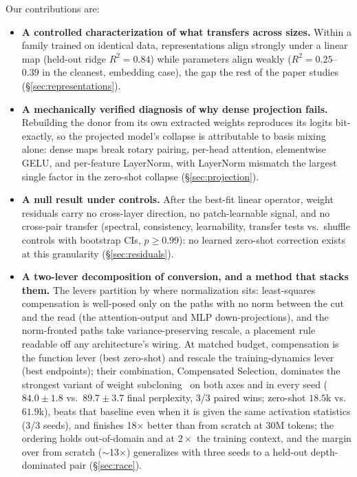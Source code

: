 Our contributions are:
\begin{itemize}
\item \textbf{A controlled characterization of what transfers across sizes.}
  Within a family trained on identical data, representations align strongly
  under a linear map (held-out ridge $R^2=0.84$) while parameters align weakly
  ($R^2=0.25$--$0.39$ in the cleanest, embedding case), the gap the rest of
  the paper studies (\S\ref{sec:representations}).
\item \textbf{A mechanically verified diagnosis of why dense projection fails.}
  Rebuilding the donor from its own extracted weights reproduces its logits
  bit-exactly, so the projected model's collapse is attributable to basis mixing
  alone: dense maps break rotary pairing, per-head attention, elementwise GELU,
  and per-feature LayerNorm, with LayerNorm mismatch the largest single
  factor in the zero-shot collapse
  (\S\ref{sec:projection}).
\item \textbf{A null result under controls.} After the best-fit linear operator,
  weight residuals carry no cross-layer direction, no patch-learnable signal, and
  no cross-pair transfer (spectral, consistency, learnability, transfer tests vs.\
  shuffle controls with bootstrap CIs, $p\ge0.99$): no learned zero-shot
  correction exists at this granularity (\S\ref{sec:residuals}).
\item \textbf{A two-lever decomposition of conversion, and a method that stacks
  them.} The levers partition by where normalization sits: least-squares
  compensation is well-posed only on the paths with no norm between the cut and
  the read (the attention-output and MLP down-projections), and the norm-fronted
  paths take variance-preserving rescale, a placement rule readable off any
  architecture's wiring. At matched budget, compensation is the function
  lever (best zero-shot) and rescale the
  training-dynamics lever (best endpoints); their combination,
  Compensated Selection, dominates the strongest variant of weight
  subcloning~\citep{samragh2023weight} on both axes and in every seed
  ($84.0\pm1.8$ vs.\ $89.7\pm3.7$ final perplexity, 3/3 paired wins; zero-shot
  $18.5$k vs.\ $61.9$k), beats that baseline even when it is given the same
  activation statistics (3/3 seeds), and finishes 18$\times$ better than from scratch at 30M
  tokens; the ordering holds out-of-domain and at $2\times$ the training context,
  and the margin over from scratch ($\sim$13$\times$) generalizes with three
  seeds to a held-out depth-dominated pair (\S\ref{sec:race}).
\end{itemize}
